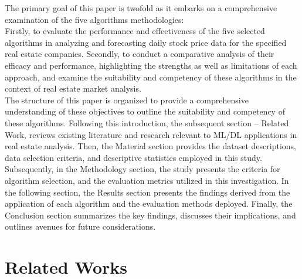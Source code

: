 \documentclass{ieeeojies}
\begin{document}
The primary goal of this paper is twofold as it embarks on a comprehensive examination of the five algorithms methodologies: \\
Firstly, to evaluate the performance and effectiveness of the five selected algorithms in analyzing and forecasting daily stock price data for the specified real estate companies.
Secondly, to conduct a comparative analysis of their efficacy and performance, highlighting the strengths as well as limitations of each approach, and examine the suitability and competency of these algorithms in the context of real estate market analysis. \\
The structure of this paper is organized to provide a comprehensive understanding of these objectives to outline the suitability and competency of these algorithms. Following this introduction, the subsequent section – Related Work, reviews existing literature and research relevant to ML/DL applications in real estate analysis. Then, the Material section provides the dataset descriptions, data selection criteria, and descriptive statistics employed in this study. Subsequently, in the Methodology section, the study presents the criteria for algorithm selection, and the evaluation metrics utilized in this investigation. In the following section, the Results section presents the findings derived from the application of each algorithm and the evaluation methods deployed. Finally, the Conclusion section summarizes the key findings, discusses their implications, and outlines avenues for future considerations.


\section{Related Works}
\end{document}
